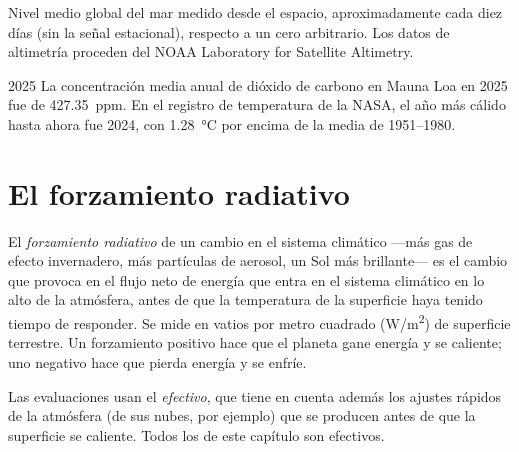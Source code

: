\begin{omfigure}

{\small Nivel medio global del mar medido desde el espacio, aproximadamente cada diez días
(sin la señal estacional), respecto a un cero arbitrario. Los datos de altimetría
proceden del NOAA Laboratory for Satellite Altimetry.}
\end{omfigure}

\begin{dated}{2025}
La concentración media anual de dióxido de carbono en Mauna Loa en 2025 fue de
\qty{427.35}{ppm}. En el registro de temperatura de la NASA, el año más cálido hasta ahora
fue 2024, con \qty{1.28}{\degreeCelsius} por encima de la media de 1951--1980.
\end{dated}

\section{El forzamiento radiativo}

\begin{definition}\label{def:g12:climate-change:forcing}
El \emph{forzamiento radiativo} de un cambio en el
sistema climático ---más gas de efecto invernadero, más partículas de aerosol, un Sol
más brillante--- es el cambio que provoca en el flujo neto de energía que entra en el
sistema climático en lo alto de la atmósfera, antes de que la temperatura de la superficie
haya tenido tiempo de responder. Se mide en vatios por metro cuadrado
(\unit{W/m^2}) de superficie terrestre. Un forzamiento positivo hace que el planeta
gane energía y se caliente; uno negativo hace que pierda energía y se enfríe.
\end{definition}

\begin{remark}\label{rem:g12:climate-change:effective}
Las evaluaciones usan el  \emph{efectivo}, que tiene en cuenta además
los ajustes rápidos de la atmósfera (de sus nubes, por ejemplo)
que se producen antes de que la superficie se caliente. Todos los  de este capítulo son
 efectivos.
\end{remark}


